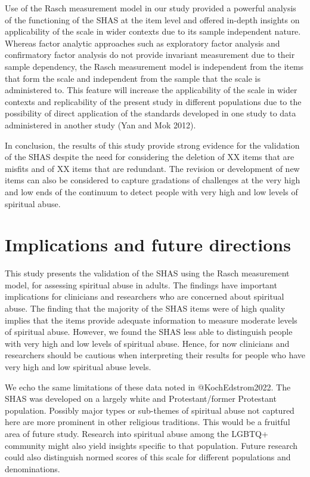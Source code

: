\documentclass[
  letterpaper,
  DIV=11,
  numbers=noendperiod]{scrreport}
\begin{document}
Use of the Rasch measurement model in our study provided a powerful
analysis of the functioning of the SHAS at the item level and offered
in-depth insights on applicability of the scale in wider contexts due to
its sample independent nature. Whereas factor analytic approaches such
as exploratory factor analysis and confirmatory factor analysis do not
provide invariant measurement due to their sample dependency, the Rasch
measurement model is independent from the items that form the scale and
independent from the sample that the scale is administered to. This
feature will increase the applicability of the scale in wider contexts
and replicability of the present study in different populations due to
the possibility of direct application of the standards developed in one
study to data administered in another study (Yan and Mok 2012).

In conclusion, the results of this study provide strong evidence for the
validation of the SHAS despite the need for considering the deletion of
XX items that are misfits and of XX items that are redundant. The
revision or development of new items can also be considered to capture
gradations of challenges at the very high and low ends of the continuum
to detect people with very high and low levels of spiritual abuse.

\hypertarget{implications-and-future-directions}{%
\section*{Implications and future
directions}\label{implications-and-future-directions}}

This study presents the validation of the SHAS using the Rasch
measurement model, for assessing spiritual abuse in adults. The findings
have important implications for clinicians and researchers who are
concerned about spiritual abuse. The finding that the majority of the
SHAS items were of high quality implies that the items provide adequate
information to measure moderate levels of spiritual abuse. However, we
found the SHAS less able to distinguish people with very high and low
levels of spiritual abuse. Hence, for now clinicians and researchers
should be cautious when interpreting their results for people who have
very high and low spiritual abuse levels.

We echo the same limitations of these data noted in @KochEdstrom2022.
The SHAS was developed on a largely white and Protestant/former
Protestant population. Possibly major types or sub-themes of spiritual
abuse not captured here are more prominent in other religious
traditions. This would be a fruitful area of future study. Research into
spiritual abuse among the LGBTQ+ community might also yield insights
specific to that population. Future research could also distinguish
normed scores of this scale for different populations and denominations.
\end{document}
